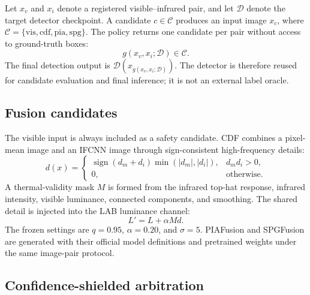 \documentclass[preprint,11pt]{elsarticle}
\begin{document}
Let \(x_v\) and \(x_i\) denote a registered visible--infrared pair, and let
\(\mathcal{D}\) denote the target detector checkpoint. A candidate
\(c\in\mathcal{C}\) produces an input image \(x_c\), where
\(\mathcal{C}=\{\mathrm{vis},\mathrm{cdf},\mathrm{pia},\mathrm{spg}\}\).
The policy returns one candidate per pair without access to ground-truth boxes:
\begin{equation}
g(x_v,x_i;\mathcal{D})\in\mathcal{C}.
\end{equation}
The final detection output is
\(\mathcal{D}(x_{g(x_v,x_i;\mathcal{D})})\). The detector is therefore reused
for candidate evaluation and final inference; it is not an external label
oracle.

\subsection{Fusion candidates}

The visible input is always included as a safety candidate. CDF combines a
pixel-mean image and an IFCNN image through sign-consistent high-frequency
details:
\begin{equation}
d(x)=
\begin{cases}
\operatorname{sign}(d_m+d_i)\min(|d_m|,|d_i|), & d_m d_i>0,\\
0, & \text{otherwise}.
\end{cases}
\end{equation}
A thermal-validity mask \(M\) is formed from the infrared top-hat response,
infrared intensity, visible luminance, connected components, and smoothing.
The shared detail is injected into the LAB luminance channel:
\begin{equation}
L' = L + \alpha M d.
\end{equation}
The frozen settings are \(q=0.95\), \(\alpha=0.20\), and \(\sigma=5\).
PIAFusion and SPGFusion are generated with their official model definitions and
pretrained weights under the same image-pair protocol.
\cite{zhang2020,tang2022,zhang2026}

\subsection{Confidence-shielded arbitration}
\end{document}
